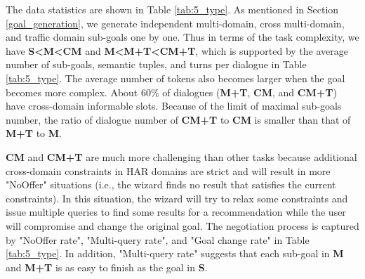 \begin{table}[]
    \centering
    \caption{Data statistics. The average numbers of sub-goals, turns, and STs (semantic tuples) are for each dialogue. The average number of tokens is for each turn.\quad~}
    \label{tab:split}
\end{table}

The data statistics are shown in Table \ref{tab:5_type}. 
As mentioned in Section \ref{goal_generation}, we generate independent multi-domain, cross multi-domain, and traffic domain sub-goals one by one. 
Thus in terms of the task complexity, we have \textbf{S<M<CM} and \textbf{M<M+T<CM+T}, which is supported by the average number of sub-goals, semantic tuples, and turns per dialogue in Table \ref{tab:5_type}. The average number of tokens also becomes larger when the goal becomes more complex. 
About 60\% of dialogues (\textbf{M+T}, \textbf{CM}, and \textbf{CM+T}) have cross-domain informable slots.
Because of the limit of maximal sub-goals number, the ratio of dialogue number of \textbf{CM+T} to \textbf{CM} is smaller than that of \textbf{M+T} to \textbf{M}.

\textbf{CM} and \textbf{CM+T} are much more challenging than other tasks because additional cross-domain constraints in HAR domains are strict and will result in more "NoOffer" situations (i.e., the wizard finds no result that satisfies the current constraints). 
In this situation, the wizard will try to relax some constraints and issue multiple queries to find some results for a recommendation while the user will compromise and change the original goal.
The negotiation process is captured by "NoOffer rate", "Multi-query rate", and "Goal change rate" in Table \ref{tab:5_type}. 
In addition, "Multi-query rate" suggests that each sub-goal in \textbf{M} and \textbf{M+T} is as easy to finish as the goal in \textbf{S}.

